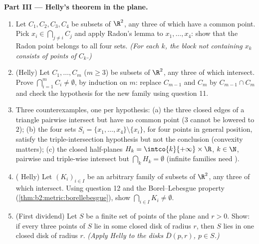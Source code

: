 \begin{problem}
\medskip
\noindent\textbf{Part III --- Helly's theorem in the plane.}
\begin{enumerate}[resume]
  \item Let $C_1, C_2, C_3, C_4$ be  subsets of $\R^2$,
        any three of which have a common point. Pick $x_i \in
        \bigcap_{j \neq i} C_j$ and apply Radon's lemma to
        $x_1, \dots, x_4$: show that the Radon point belongs
        to all four sets. \emph{(For each $k$, the block not
        containing $x_k$ consists of points of $C_k$.)}
  \item (Helly) Let $C_1, \dots, C_m$ ($m \geq 3$) be 
        subsets of $\R^2$, any three of which intersect.
        Prove $\bigcap_{i=1}^m C_i \neq \emptyset$, by
        induction on $m$: replace $C_{m-1}$ and $C_m$ by
        $C_{m-1} \cap C_m$ and check the hypothesis for the
        new family using question 11.
  \item Three counterexamples, one per hypothesis: (a) the
        three closed edges of a triangle pairwise intersect
        but have no common point ($3$ cannot be lowered to
        $2$); (b) the four sets $S_i = \{x_1, \dots, x_4\}
        \setminus \{x_i\}$, for four points in general
        position, satisfy the triple-intersection hypothesis
        but not the conclusion (convexity matters); (c) the
        closed half-planes $H_k = \intco{k}{+\infty} \times
        \R$, $k \in \N$, pairwise and triple-wise intersect
        but $\bigcap_k H_k = \emptyset$ (infinite families
        need ).
  \item ( Helly) Let $(K_i)_{i \in I}$ be an arbitrary
        family of   subsets of $\R^2$, any three
        of which intersect. Using question 12 and the
        Borel--Lebesgue property
        (\cref{thm:b2:metric:borellebesgue}), show
        $\bigcap_{i \in I} K_i \neq \emptyset$.
  \item (First dividend) Let $S$ be a finite set of points of
        the plane and $r > 0$. Show: if every three points of
        $S$ lie in some closed disk of radius $r$, then $S$
        lies in one closed disk of radius $r$. \emph{(Apply
        Helly to the disks $\overline D(p, r)$, $p \in S$.)}
\end{enumerate}


\end{problem}
